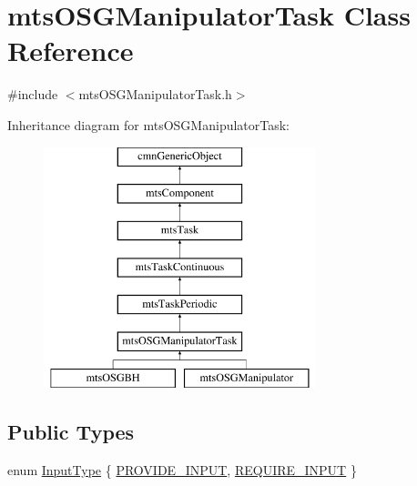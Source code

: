 \hypertarget{classmts_o_s_g_manipulator_task}{\section{mts\-O\-S\-G\-Manipulator\-Task Class Reference}
\label{classmts_o_s_g_manipulator_task}
}


{\ttfamily \#include $<$mts\-O\-S\-G\-Manipulator\-Task.\-h$>$}

Inheritance diagram for mts\-O\-S\-G\-Manipulator\-Task\-:\begin{figure}[H]
\begin{center}
\leavevmode
\includegraphics[height=7.000000cm]{d7/db9/classmts_o_s_g_manipulator_task}
\end{center}
\end{figure}
\subsection*{Public Types}
\begin{DoxyCompactItemize}
\item 
enum \hyperlink{classmts_o_s_g_manipulator_task_a176aa50980ddf34d1150514bb620cb8f}{Input\-Type} \{ \hyperlink{classmts_o_s_g_manipulator_task_a176aa50980ddf34d1150514bb620cb8fa73f760c3f4b883d0ce1a241d172e626a}{P\-R\-O\-V\-I\-D\-E\-\_\-\-I\-N\-P\-U\-T}, 
\hyperlink{classmts_o_s_g_manipulator_task_a176aa50980ddf34d1150514bb620cb8fa7ff96839bee571149d1dbf57ca86cda8}{R\-E\-Q\-U\-I\-R\-E\-\_\-\-I\-N\-P\-U\-T}
 \}
\end{DoxyCompactItemize}
